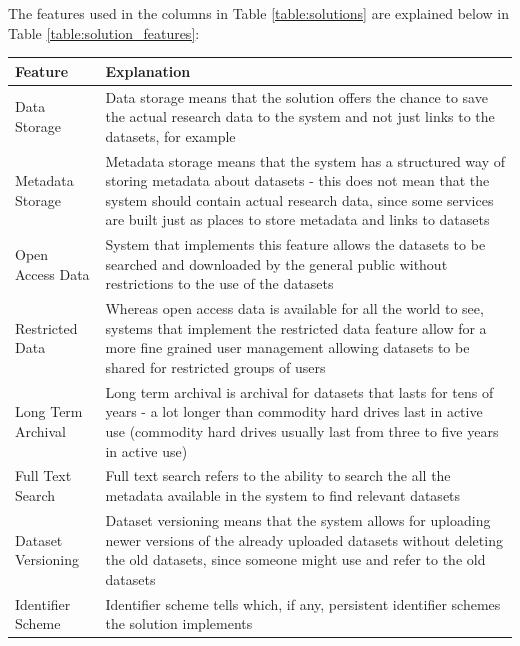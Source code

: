 The features used in the columns in Table \ref{table:solutions} are explained
below in Table \ref{table:solution_features}:


\addtocounter{table}{-1}
\label{table:solution_features}
    \begin{tabularx}{\textwidth}{| >{\raggedright}p{3cm} | X |}
    \hline
    \textbf{Feature} & \textbf{Explanation} \\
    \hline
    \rowcolor{Gray}
    Data Storage    & Data storage means that the solution offers the chance to
                      save the actual research data to the system and not just links
                      to the datasets, for example\\
    \hline
    Metadata Storage &  Metadata storage means that the system has a structured way
                        of storing metadata about datasets - this does not mean that
                        the system should contain actual research data, since some services
                        are built just as places to store metadata and links to datasets\\
    \hline
    \rowcolor{Gray}
    Open Access Data    & System that implements this feature allows the datasets to be searched
                          and downloaded by the general public without restrictions to the use
                          of the datasets\\
    \hline
    Restricted Data    & Whereas open access data is available for all the world to see, systems
                         that implement the restricted data feature allow for a more fine grained
                         user management allowing datasets to be shared for restricted groups
                         of users\\
    \hline
    \rowcolor{Gray}
    Long Term Archival    & Long term archival is archival for datasets that lasts for tens of years -
                            a lot longer than commodity hard drives last in active use (commodity
                            hard drives usually last from three to five years in active use)\\
    \hline
    Full Text Search    & Full text search refers to the ability to search the all the metadata
                          available in the system to find relevant datasets\\
    \hline
    \rowcolor{Gray}
    Dataset Versioning    & Dataset versioning means that the system allows for uploading newer versions
                           of the already uploaded datasets without deleting the old datasets, since
                           someone might use and refer to the old datasets\\
    \hline
    Identifier Scheme    & Identifier scheme tells which, if any, persistent identifier schemes the
                           solution implements\\
    \hline
\end{tabularx}

